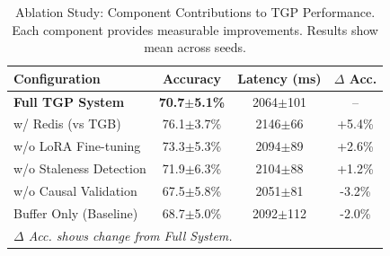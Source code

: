 
\begin{table}[t]
\centering
\caption{Ablation Study: Component Contributions to TGP Performance.
Each component provides measurable improvements. Results show mean across seeds.}
\label{tab:ablation_study}
\begin{tabular}{l c c c}
\toprule
\textbf{Configuration} & \textbf{Accuracy} & \textbf{Latency (ms)} & \textbf{$\Delta$ Acc.} \\
\midrule
\textbf{Full TGP System} & \textbf{70.7$\pm$5.1\%} & 2064$\pm$101 & -- \\
w/ Redis (vs TGB) & 76.1$\pm$3.7\% & 2146$\pm$66 & +5.4\% \\
w/o LoRA Fine-tuning & 73.3$\pm$5.3\% & 2094$\pm$89 & +2.6\% \\
w/o Staleness Detection & 71.9$\pm$6.3\% & 2104$\pm$88 & +1.2\% \\
w/o Causal Validation & 67.5$\pm$5.8\% & 2051$\pm$81 & -3.2\% \\
Buffer Only (Baseline) & 68.7$\pm$5.0\% & 2092$\pm$112 & -2.0\% \\

\midrule
\multicolumn{4}{l}{\textit{$\Delta$ Acc. shows change from Full System.}} \\
\bottomrule
\end{tabular}
\end{table}
